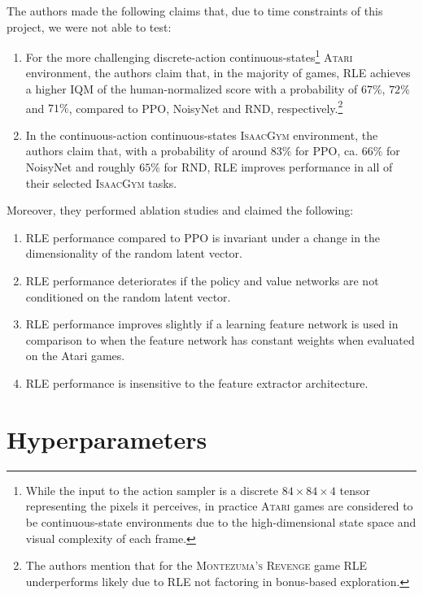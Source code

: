 \noindent The authors made the following claims that, due to time constraints of this project, we were not able to test:

\begin{enumerate}
  \item For the more challenging discrete-action continuous-states\footnote{While the input to the action sampler is a discrete $84\times84\times4$ tensor representing the pixels it perceives, in practice \textsc{Atari} games are considered to be continuous-state environments due to the high-dimensional state space and visual complexity of each frame.} \textsc{Atari} environment, the authors claim that, in the majority of games, RLE achieves a higher IQM of the human-normalized score with a probability of $67\%$, $72\%$ and $71\%$, compared to PPO, NoisyNet and RND, respectively.\footnote{The authors mention that for the \textsc{Montezuma's Revenge} game RLE underperforms likely due to RLE not factoring in bonus-based exploration.}
  \item In the continuous-action continuous-states \textsc{IsaacGym} environment, the authors claim that, with a probability of around $83\%$ for PPO, ca. $66\%$ for NoisyNet and roughly $65\%$ for RND, RLE improves performance in all of their selected \textsc{IsaacGym} tasks.
\end{enumerate}

\noindent Moreover, they performed ablation studies and claimed the following:

\begin{enumerate}
  \item RLE performance compared to PPO is invariant under a change in the dimensionality of the random latent vector.
  \item RLE performance deteriorates if the policy and value networks are not conditioned on the random latent vector.
  \item RLE performance improves slightly if a learning feature network is used in comparison to when the feature network has constant weights when evaluated on the Atari games.
  \item RLE performance is insensitive to the feature extractor architecture.
\end{enumerate}

\hypertarget{appendix-hyperparams}{\section{Hyperparameters}}


